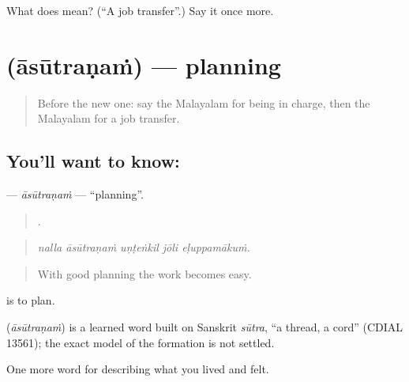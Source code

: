 \begin{tcolorbox}[breakable,colback=teal!4,colframe=teal!35!black,title={Before you move on}]
What does  mean? (\textquotedblleft{}A job transfer\textquotedblright{}.) Say it once more.
\end{tcolorbox}
\section[\texorpdfstring{\ml{ആസൂത്രണം} (āsūtraṇaṁ)}{ആസൂത്രണം (āsūtraṇaṁ)}]{ (āsūtraṇaṁ) — planning}

\label{lesson:ML-C545-asutranam}



\begin{quote}
Before the new one: say the Malayalam for being in charge, then the Malayalam for a job transfer.
\end{quote}

\subsection*{You'll want to know: }
\textbf{} — \emph{āsūtraṇaṁ} — \textquotedblleft{}planning\textquotedblright{}.

\begin{quote}
    .
\end{quote}

\begin{quote}
\emph{nalla āsūtraṇaṁ uṇṭeṅkil jōli eḷuppamākuṁ.}
\end{quote}

\begin{quote}
With good planning the work becomes easy.
\end{quote}

  is to plan.

\begin{cousinweb}
\textbf{} (\emph{āsūtraṇaṁ}) is a learned word built on Sanskrit \emph{sūtra}, \textquotedblleft{}a thread, a cord\textquotedblright{} (CDIAL 13561); the exact model of the formation is not settled.
\end{cousinweb}

\begin{grammarlens}[title={What you've built}]
One more word for describing what you lived and felt.
\end{grammarlens}

